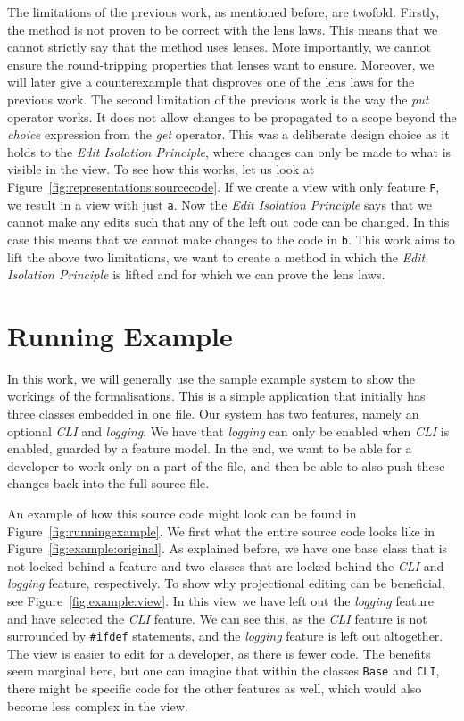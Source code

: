 The limitations of the previous work, as mentioned before, are twofold. Firstly, the
method is not proven to be correct with the lens laws. This means that we cannot strictly
say that the method uses lenses. More importantly, we cannot ensure the round-tripping
properties that lenses want to ensure. Moreover, we will later give a counterexample
that disproves one of the lens laws for the previous work. The second limitation of the
previous work is the way the \emph{put}
operator works. It does not allow changes to be propagated to a scope beyond
the \emph{choice} expression from the \emph{get} operator. This was a
deliberate design choice as it holds to the \emph{Edit Isolation Principle},
where changes can only be made to what is visible in the view. To see how this works,
let us look at Figure~\ref{fig:representations:sourcecode}. If we create a view with
only feature \texttt{F}, we result in a view with just \texttt{a}. Now the \emph{Edit Isolation Principle}
says that we cannot make any edits such that any of the left out code can be changed.
In this case this means that we cannot make changes to the code in \texttt{b}. 
This work aims to lift the above two limitations, we want to create a method in which
the \emph{Edit Isolation Principle} is lifted and for which we can prove the lens laws.

\section{Running Example}\label{sec:background:example}
In this work, we will generally use the sample example system to show the workings of
the formalisations. This is a simple application that initially has three classes
embedded in one file. Our system has two features, namely an optional \emph{CLI} and
\emph{logging}. We have that \emph{logging} can only be enabled when \emph{CLI} is
enabled, guarded by a feature model. In the end, we want to be able for a developer
to work only on a part of the file, and then be able to also push these changes
back into the full source file.

An example of how this source code might look can be found in Figure~\ref{fig:runningexample}.
We first what the entire source code looks like in Figure~\ref{fig:example:original}.
As explained before, we have one base class that is not locked behind a feature and two
classes that are locked behind the \emph{CLI} and \emph{logging} feature, respectively.
To show why projectional editing can be beneficial, see Figure~\ref{fig:example:view}.
In this view we have left out the \emph{logging} feature and have selected the \emph{CLI}
feature. We can see this, as the \emph{CLI} feature is not surrounded by \texttt{\#ifdef}
statements, and the \emph{logging} feature is left out altogether. The view is easier to
edit for a developer, as there is fewer code. The benefits seem marginal here, but one
can imagine that within the classes \texttt{Base} and \texttt{CLI}, there might be specific
code for the other features as well, which would also become less complex in the view.

